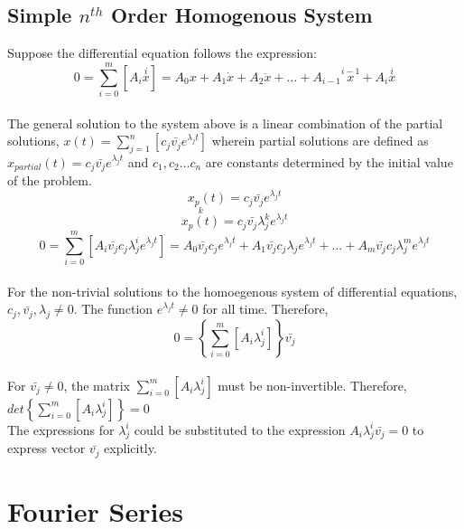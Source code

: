 \documentclass[a4paper, 12pt]{report}
\def\la{\lambda}
\def\f{\frac}
\def\l{\left}
\def\r{\right}
\def\dst{\displaystyle}
\def\b{\bar}
\let\stdsection\section
\renewcommand\section{\newpage\stdsection}
\begin{document}
\begin{center}
\subsection{Simple $n^{th}$ Order Homogenous System}
Suppose the differential equation follows the expression:
$$0 = \sum_{i = 0}^{m}{[A_i \overset{i}{x}]} = A_0 x + A_1 \dot{x} + A_2 \ddot{x}+ \dots + A_{i - 1} \overset{i -  1}{x} + A_{i} \overset{i}{x}$$
\\The general solution to the system above is a linear combination of the partial solutions, $\dst{x(t) = \sum_{j = 1}^{n}{[c_j \b{v_j}e^{\la_j t}]}}$ wherein partial solutions are defined as $\dst{x_{partial}(t) = c_j \b{v_j}e^{\la_j t}}$ and $c_1, c_2 \dots c_n$ are constants determined by the initial value of the problem. 
$$x_{p}(t) = c_j \b{v_j}e^{\la_j t}$$
$$\overset{k}{x_{p}(t)} = c_j \b{v_j}\la_{j}^k e^{\la_j t}$$
$$0 = \sum_{i = 0}^{m}{[A_i \b{v_j} c_j \la_{j}^i e^{\la_j t}]} =A_0 \b{v_j} c_j e^{\la_j t} + A_1 \b{v_j} c_j \la_{j} e^{\la_j t} + \dots + A_m \b{v_j} c_j \la_{j}^m e^{\la_j t}$$
\\For the non-trivial solutions to the homoegenous system of differential equations, $\dst{c_j, \b{v_j}, \la_j \neq 0}$. The function $\dst{e^{\la_j t}}\neq 0$ for all time. Therefore, 
$$0 = \l\{ \sum_{i = 0}^{m}{[A_i \la_{j}^i]} \r\} \b{v_j}$$
\\For $\dst{\b{v_j} \neq 0}$, the matrix $\dst{\sum_{i = 0}^{m}{[A_i \la_{j}^i]}}$ must be non-invertible. Therefore, $\dst{det\l\{ \sum_{i = 0}^{m}{[A_i \la_{j}^i]} \r\} = 0}$
\\The expressions for $\dst{\la_j ^ i}$ could be substituted to the expression $\dst{A_i \la_{j}^i} \b{v_j} = 0$ to express vector $\dst{\b{v_j}}$ explicitly.
\section{Fourier Series}
\begin{comment}
Fourier Transform Header
The Fourier Series in Trigonometric form,
$$f(t) = \f{1}{2}a_0 + \sum_{n = 1}^{\infty}\l[a_n \cos\l(\f{n\pi}{L}t\r) + b_n \sin\l(\f{n\pi}{L}t\r)\r]$$
\end{comment}

\end{center}
\end{document}
